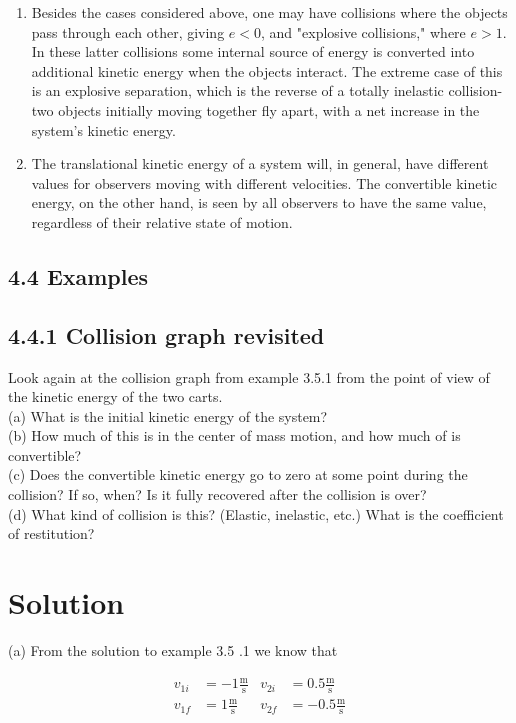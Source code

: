 \documentclass[10pt]{article}
\begin{document}
\begin{enumerate}
  \item Besides the cases considered above, one may have collisions where the objects pass through each other, giving $e<0$, and "explosive collisions," where $e>1$. In these latter collisions some internal source of energy is converted into additional kinetic energy when the objects interact. The extreme case of this is an explosive separation, which is the reverse of a totally inelastic collision-two objects initially moving together fly apart, with a net increase in the system's kinetic energy.
  \item The translational kinetic energy of a system will, in general, have different values for observers moving with different velocities. The convertible kinetic energy, on the other hand, is seen by all observers to have the same value, regardless of their relative state of motion.
\end{enumerate}

\subsection*{4.4 Examples}
\subsection*{4.4.1 Collision graph revisited}
Look again at the collision graph from example 3.5.1 from the point of view of the kinetic energy of the two carts.\\
(a) What is the initial kinetic energy of the system?\\
(b) How much of this is in the center of mass motion, and how much of is convertible?\\
(c) Does the convertible kinetic energy go to zero at some point during the collision? If so, when? Is it fully recovered after the collision is over?\\
(d) What kind of collision is this? (Elastic, inelastic, etc.) What is the coefficient of restitution?

\section*{Solution}
(a) From the solution to example 3.5 .1 we know that

$$
\begin{aligned}
v_{1 i} & =-1 \frac{\mathrm{m}}{\mathrm{s}} & v_{2 i} & =0.5 \frac{\mathrm{m}}{\mathrm{s}} \\
v_{1 f} & =1 \frac{\mathrm{m}}{\mathrm{s}} & v_{2 f} & =-0.5 \frac{\mathrm{m}}{\mathrm{s}}
\end{aligned}
$$
\end{document}
